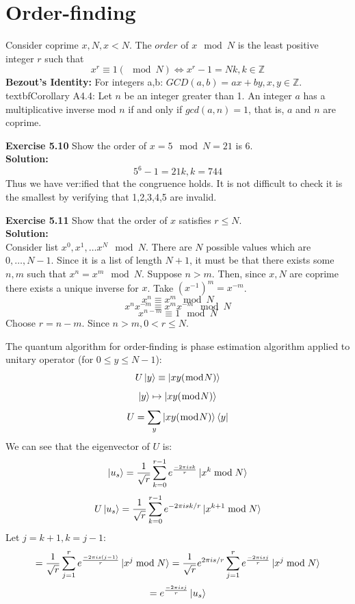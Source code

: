 \documentclass{article}
\begin{document}
\section{Order-finding}
Consider coprime $x, N, x<N$. The $order$ of $x\mod N$ is the least positive integer $r$ such that
$$x^r \equiv 1(\mod N) \iff x^r - 1 = Nk, k \in \mathbb{Z}$$
\textbf{Bezout's Identity:} For integers a,b: $GCD(a,b) = ax + by, x,y \in \mathbb{Z}$.\\
textbf{Corollary A4.4}: Let $n$ be an integer greater than 1. An integer $a$ has a multiplicative inverse mod $n$ if and only if $gcd(a,n) = 1$, that is, $a$ and $n$ are coprime.
\begin{tcolorbox}\textbf{Exercise 5.10} Show the order of $x=5 \mod N = 21$ is 6.\\
\textbf{Solution:}
$$5^6 - 1 = 21k, k=744$$
Thus we have ver:ified that the congruence holds. It is not difficult to check it is the smallest by verifying that 1,2,3,4,5 are invalid.
\end{tcolorbox}
\begin{tcolorbox}\textbf{Exercise 5.11} Show that the order of $x$ satisfies $r\leq N$.\\
\textbf{Solution:}\\
Consider list $x^0, x^1, \dots x^{N} \mod N$. There are $N$ possible values which are $0, \dots, N-1$. Since it is a list of length $N+1$, it must be that there exists some $n,m$ such that $x^n = x^m \mod N$. Suppose $n>m$. Then, since $x,N$ are coprime there exists a unique inverse for $x$. Take $(x^{-1})^m = x^{-m}$. 
$$x^n \equiv x^m \mod N$$
$$x^n x^{-m} \equiv x^m x^{-m} \mod N$$
$$x^{n-m} \equiv 1 \mod N$$
Choose $r = n-m$. Since $n>m, 0 < r \leq N$. 
\end{tcolorbox}
The quantum algorithm for order-finding is phase estimation algorithm applied to unitary operator (for $0 \leq y \leq N-1$):
	$$U\ket{y} \equiv \ket{xy(\bmod N)}$$
	$$\ket{y} \mapsto \ket{xy (\bmod N)}$$
	$$U = \sum_{y}\ket{xy(\bmod N)}\bra{y}$$
We can see that the eigenvector of $U$ is:
$$\ket{u_s} = \frac{1}{\sqrt{r}} \sum^{r-1}_{k=0} e^{\frac{-2\pi i sk}{r}} \ket{x^k\bmod N}$$
$$U \ket{u_s} = \frac{1}{\sqrt{r}} \sum^{r-1}_{k=0} e^{-2\pi isk/r} \ket{x^{k+1}\bmod N}$$
Let $j=k+1, k=j-1:$
$$=\frac{1}{\sqrt{r}} \sum^{r}_{j=1} e^{\frac{-2\pi is (j-1)}{r}} \ket{x^j \bmod N} =\frac{1}{\sqrt{r}} e^{2\pi is/r} \sum^{r}_{j=1} e^{\frac{-2\pi is j}{r}} \ket{x^j \bmod N}$$
$$= e^{\frac{-2\pi isj}{r}} \ket{u_s}$$
\end{document}
